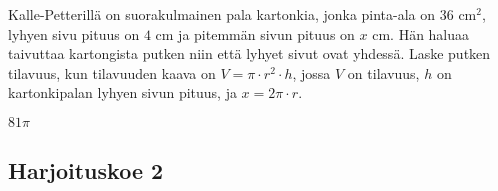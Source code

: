 	\begin{tehtava}
Kalle-Petterillä on suorakulmainen pala kartonkia, jonka pinta-ala on $36$ cm$^2$, lyhyen sivu pituus on $4$ cm ja pitemmän sivun pituus on $x$ cm. Hän haluaa taivuttaa kartongista putken niin että lyhyet sivut ovat yhdessä. Laske putken tilavuus, kun tilavuuden kaava on $V=\pi\cdot r^2\cdot h$, jossa $V$ on tilavuus, $h$ on kartonkipalan lyhyen sivun pituus, ja $x=2\pi\cdot r$.    
\begin{vastaus}
 $81 \pi$
\end{vastaus}

\end{tehtava}

\subsection*{Harjoituskoe 2}

